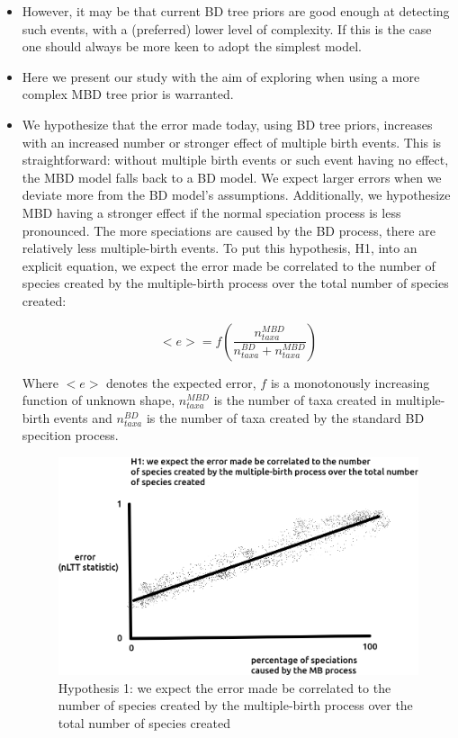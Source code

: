 \documentclass{article}
\begin{document}
\begin{itemize}
\item However, it may be that current BD tree priors are good enough 
at detecting such events, with a (preferred) lower level of complexity. 
If this is the case one should always be more keen to adopt the simplest model.

\item Here we present our study with the aim of exploring 
when using a more complex MBD tree prior is warranted.

\item We hypothesize that the error made today, using BD tree priors,
increases with an increased number or stronger effect of multiple birth events.
This is straightforward: without multiple birth events or such event having
no effect, the MBD model falls back to a BD model. We expect larger
errors when we deviate more from the BD model's assumptions. 
Additionally, we hypothesize MBD having a stronger effect if the normal
speciation process is less pronounced. The more speciations are caused by the
BD process, there are relatively less multiple-birth events.
To put this hypothesis, H1, into an explicit equation, 
we expect the error made be correlated to the number 
of species created by the multiple-birth process over the total number 
of species created:

\begin{equation}
<e> = f(\frac{n_{taxa}^{MBD}}{n_{taxa}^{BD} + n_{taxa}^{MBD}})
\end{equation} 

Where $<e>$ denotes the expected error, $f$ is a monotonously increasing 
function of unknown shape, $n_{taxa}^{MBD}$ is the number of taxa created
in multiple-birth events and $n_{taxa}^{BD}$ is the number of taxa created
by the standard BD specition process. 

\begin{figure}[!htbp]
  \includegraphics[width=\textwidth]{fig_h_1.png}
  \caption{
    Hypothesis 1: we expect the error made be correlated to the number 
    of species created by the multiple-birth process over the total number 
    of species created
  }
  \label{fig_h_1}
\end{figure}


\end{itemize}
\end{document}

